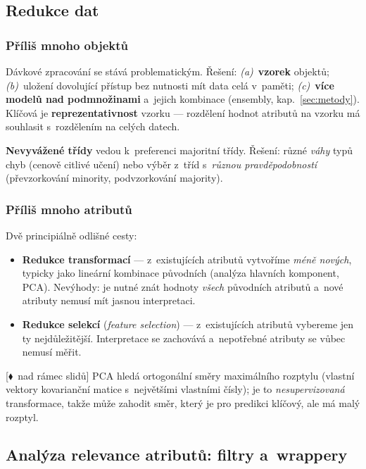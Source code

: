 \documentclass[11pt,a4paper]{article}
\theoremstyle{definition}
\newcommand{\mimo}{\textcolor{markcol}{\textsf{\footnotesize[$\blacklozenge$~nad rámec slidů]}}}
\begin{document}
\subsection{Redukce dat}

\subsubsection{Příliš mnoho objektů}

Dávkové zpracování se stává problematickým. Řešení: \emph{(a)}~\textbf{vzorek} objektů;
\emph{(b)}~uložení dovolující přístup bez nutnosti mít data celá v~paměti; \emph{(c)}~\textbf{více
modelů nad podmnožinami} a~jejich kombinace (ensembly, kap.~\ref{sec:metody}). Klíčová je
\textbf{reprezentativnost} vzorku --- rozdělení hodnot atributů na vzorku má souhlasit
s~rozdělením na celých datech.

\textbf{Nevyvážené třídy} vedou k~preferenci majoritní třídy. Řešení: různé \emph{váhy} typů
chyb (cenově citlivé učení) nebo výběr z~tříd s~\emph{různou pravděpodobností} (převzorkování
minority, podvzorkování majority).

\subsubsection{Příliš mnoho atributů}

Dvě principiálně odlišné cesty:

\begin{itemize}
\item \textbf{Redukce transformací} --- z~existujících atributů vytvoříme \emph{méně nových},
      typicky jako lineární kombinace původních (analýza hlavních komponent, PCA). Nevýhody:
      je nutné znát hodnoty \emph{všech} původních atributů a~nové atributy nemusí mít
      jasnou interpretaci.
\item \textbf{Redukce selekcí} (\emph{feature selection}) --- z~existujících atributů
      vybereme jen ty nejdůležitější. Interpretace se zachovává a~nepotřebné atributy se
      vůbec nemusí měřit.
\end{itemize}

\mimo{} PCA hledá ortogonální směry maximálního rozptylu (vlastní vektory kovarianční
matice s~největšími vlastními čísly); je to \emph{nesupervizovaná} transformace, takže může
zahodit směr, který je pro predikci klíčový, ale má malý rozptyl.

\subsection{Analýza relevance atributů: filtry a~wrappery}
\label{ssec:filtr}
\end{document}
